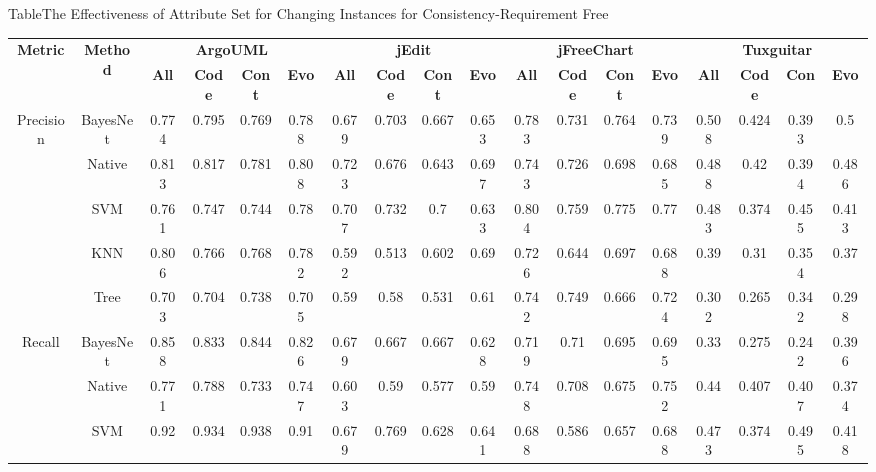 {{\begin{table*}[htbp]
\scriptsize
{Table$\!$}{The Effectiveness of Attribute Set for Changing Instances for Consistency-Requirement Free}
\vspace{0.5em}
\centering
\begin{tabular}{cccccccccccccccccc}
\toprule[1.5pt]
\multirow{2}{*}{\textbf{Metric}}&\multirow{2}{*}{\textbf{Method}}&\multicolumn{4}{c}{\textbf{ArgoUML}}&\multicolumn{4}{c}{\textbf{jEdit}}&\multicolumn{4}{c}{\textbf{jFreeChart}}&\multicolumn{4}{c}{\textbf{Tuxguitar}}\\
\cline{3-18}
&&\textbf{All}&\textbf{Code}&\textbf{Cont}&\textbf{Evo}&\textbf{All}&\textbf{Code}&\textbf{Cont}&\textbf{Evo}&\textbf{All}&\textbf{Code}&\textbf{Cont}&\textbf{Evo}&\textbf{All}&\textbf{Code}&\textbf{Con}&\textbf{Evo}~\\
\midrule[1pt]
\multirow{5}{*}{Precision}
&BayesNet&0.774&	0.795	&0.769	&0.788		&0.679	&0.703	&0.667	&0.653		&0.783	&0.731	&0.764	&0.739	&	0.508	&0.424	&0.393	&0.5\\
&Native&0.813	&0.817	&0.781&	0.808	&	0.723	&0.676	&0.643	&0.697	&	0.743	&0.726&	0.698&	0.685	&	0.488	&0.42	&0.394	&0.486\\
&SVM&	0.761	&0.747	&0.744	&0.78	&	0.707	&0.732	&0.7	&0.633		&0.804	&0.759	&0.775	&0.77	&	0.483&	0.374	&0.455	&0.413\\
&KNN&	0.806	&0.766	&0.768	&0.782	&	0.592	&0.513	&0.602	&0.69		&0.726	&0.644	&0.697	&0.688		&0.39	&0.31	&0.354	&0.37\\
&Tree&	0.703&	0.704	&0.738	&0.705	&	0.59	&0.58&	0.531	&0.61		&0.742	&0.749	&0.666	&0.724		&0.302	&0.265	&0.342	&0.298\\
\hline
\multirow{5}{*}{Recall}
&BayesNet&0.858&	0.833	&0.844	&0.826	&	0.679&	0.667	&0.667	&0.628	&	0.719	&0.71	&0.695	&0.695&		0.33	&0.275	&0.242&	0.396\\
&Native&0.771	&0.788	&0.733	&0.747	&	0.603&	0.59&	0.577	&0.59	&	0.748	&0.708	&0.675	&0.752	&	0.44	&0.407	&0.407&	0.374\\
&SVM&	0.92	&0.934&	0.938&	0.91	&	0.679	&0.769	&0.628	&0.641&		0.688&	0.586	&0.657	&0.688	&	0.473	&0.374	&0.495	&0.418\\

\end{tabular}
\end{table*}}}
